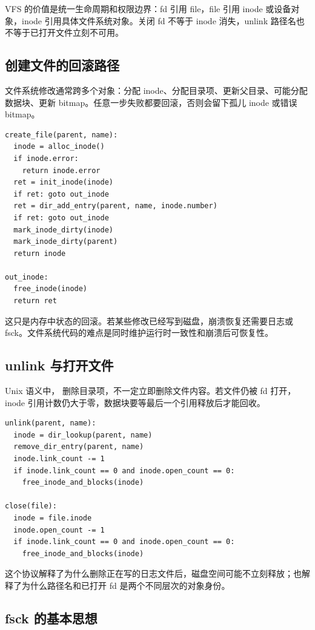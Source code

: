 VFS 的价值是统一生命周期和权限边界：fd 引用 file，file 引用 inode 或设备对象，inode 引用具体文件系统对象。关闭 fd 不等于 inode 消失，unlink 路径名也不等于已打开文件立刻不可用。

\subsection{创建文件的回滚路径}

文件系统修改通常跨多个对象：分配 inode、分配目录项、更新父目录、可能分配数据块、更新 bitmap。任意一步失败都要回滚，否则会留下孤儿 inode 或错误 bitmap。

\begin{lstlisting}
create_file(parent, name):
  inode = alloc_inode()
  if inode.error:
    return inode.error
  ret = init_inode(inode)
  if ret: goto out_inode
  ret = dir_add_entry(parent, name, inode.number)
  if ret: goto out_inode
  mark_inode_dirty(inode)
  mark_inode_dirty(parent)
  return inode

out_inode:
  free_inode(inode)
  return ret
\end{lstlisting}

这只是内存中状态的回滚。若某些修改已经写到磁盘，崩溃恢复还需要日志或 fsck。文件系统代码的难点是同时维护运行时一致性和崩溃后可恢复性。

\subsection{unlink 与打开文件}

Unix 语义中， 删除目录项，不一定立即删除文件内容。若文件仍被 fd 打开，inode 引用计数仍大于零，数据块要等最后一个引用释放后才能回收。

\begin{lstlisting}
unlink(parent, name):
  inode = dir_lookup(parent, name)
  remove_dir_entry(parent, name)
  inode.link_count -= 1
  if inode.link_count == 0 and inode.open_count == 0:
    free_inode_and_blocks(inode)

close(file):
  inode = file.inode
  inode.open_count -= 1
  if inode.link_count == 0 and inode.open_count == 0:
    free_inode_and_blocks(inode)
\end{lstlisting}

这个协议解释了为什么删除正在写的日志文件后，磁盘空间可能不立刻释放；也解释了为什么路径名和已打开 fd 是两个不同层次的对象身份。

\subsection{fsck 的基本思想}

